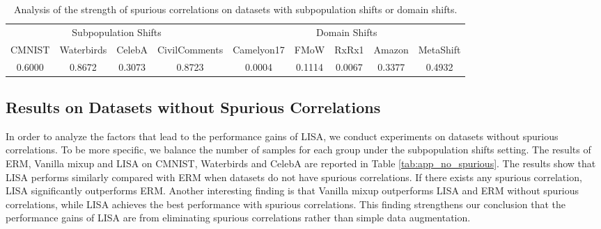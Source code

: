 

\begin{table*}[h]
\small
\caption{Analysis of the strength of spurious correlations on datasets with subpopulation shifts or domain shifts.}
\label{tab:spurious_strength}
\begin{center}
\begin{tabular}{cccc|ccccc}
\toprule
\multicolumn{4}{c|}{Subpopulation Shifts} & \multicolumn{5}{c}{Domain Shifts}\\
CMNIST & Waterbirds & CelebA & CivilComments & Camelyon17 & FMoW & RxRx1 & Amazon & MetaShift \\\midrule
0.6000 & 0.8672 & 0.3073 & 0.8723 & 0.0004 & 0.1114 & 0.0067 & 0.3377 & 0.4932 \\
\bottomrule
\end{tabular}
\end{center}
\end{table*}





\subsection{Results on Datasets without Spurious Correlations}
\label{sec:app_no_spurious}
In order to analyze the factors that lead to the performance gains of LISA, we conduct experiments on datasets without spurious correlations. To be more specific, we balance the number of samples for each group under the subpopulation shifts setting. The results of ERM, Vanilla mixup and LISA on CMNIST, Waterbirds and CelebA are reported in Table \ref{tab:app_no_spurious}. The results show that LISA performs similarly compared with ERM when datasets do not have spurious correlations. If there exists any spurious correlation, LISA significantly outperforms ERM. Another interesting finding is that Vanilla mixup outperforms LISA and ERM without spurious correlations, while LISA achieves the best performance with spurious correlations. This finding strengthens our conclusion that the performance gains of LISA are from eliminating spurious correlations rather than simple data augmentation.


